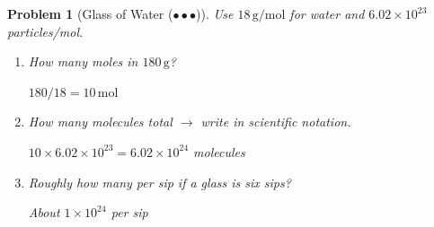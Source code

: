 \documentclass[a4paper,11pt]{article}
\newcommand{\hard}{(\ensuremath{\bullet \bullet \bullet})}
\theoremstyle{listprobstyle}
\newtheorem{problem}{Problem}
\newenvironment{solution}
    {\par\begingroup\color{BrickRed}}
    {\par\endgroup}
\begin{document}
\begin{problem}[Glass of Water \hard]
Use $18\,\mathrm{g/mol}$ for water and $6.02 \times 10^{23}$
particles/mol.
\vspace{-0.6\baselineskip}
\begin{enumerate}[label=\alph*),itemsep=0pt,parsep=0pt,topsep=0pt]
\item How many moles in $180\,\mathrm{g}$?
\begin{solution}
$180/18 = 10\,\mathrm{mol}$
\end{solution}
\vspace{0.5\baselineskip}

\item How many molecules total $\rightarrow$ write in scientific
notation.
\begin{solution}
$10 \times 6.02 \times 10^{23} = 6.02 \times 10^{24}$ molecules
\end{solution}
\vspace{0.5\baselineskip}

\item Roughly how many per sip if a glass is six sips?
\begin{solution}
About $1 \times 10^{24}$ per sip
\end{solution}
\vspace{0.5\baselineskip}
\end{enumerate}
\end{problem}
\end{document}
